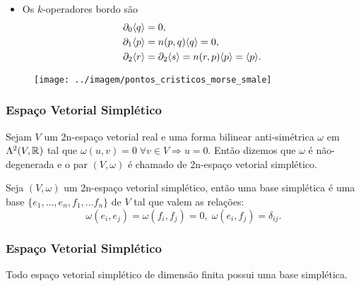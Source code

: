 \documentclass{beamer}
\begin{document}
\begin{footnotesize}
\begin{frame}
\begin{minipage}[t]{0.5\linewidth}
\begin{itemize}
				\item Os $k$-operadores bordo são
				$$
				\begin{aligned}
				\partial_{0}\langle q\rangle &=0, 
				\\
				\partial_{1}\langle p\rangle &=n(p,q)\langle q\rangle = 0,
				\\
				\partial_{2}\langle r\rangle&=\partial_{2}\langle s\rangle = n(r,p)\langle p\rangle = \langle p\rangle.
				\end{aligned}
				$$
				
			\end{itemize}
		\end{minipage}
		\hfill%
		\begin{minipage}[t]{0.4\linewidth}
			\begin{figure}
				\centering
				\textbf{}\par
				\texttt{[image: ../imagem/pontos\_cristicos\_morse\_smale]}
			\end{figure}
			
		\end{minipage}
		
	\end{frame}
	

	\begin{frame}
		\frametitle{Espaço Vetorial Simplético}
		\begin{definicao}
			Sejam $V$ um 2n-espaço vetorial real e uma forma bilinear anti-simétrica $\omega$ em $\Lambda^{2}(V, \mathbb{R}^{})$ tal que $\omega(u,v) = 0 \; \forall v \in V \Rightarrow u=0$. Então dizemos que $\omega$ é não-degenerada e o par $(V, \omega)$ é chamado de 2n-espaço vetorial simplético.
		\end{definicao}
		\begin{definicao}
			Seja $(V, \omega)$ um 2n-espaço vetorial simplético, então uma base simplética é uma base $\{ e_{1},\dots, e_{n},f_{1},\dots f_{n}\}$ de $V$ tal que valem as relações:
			$$
			\omega(e_{i}, e_{j}) = \omega(f_{i}, f_{j}) = 0, \; \omega(e_{i}, f_{j}) = \delta_{ij}.
			$$
		\end{definicao}
		
	\end{frame}
	
	\begin{frame}
		\frametitle{Espaço Vetorial Simplético}
		\begin{teorema}
			Todo espaço vetorial simplético de dimensão finita possui uma base simplética.
		\end{teorema}
		

\end{frame}
\end{footnotesize}
\end{document}
